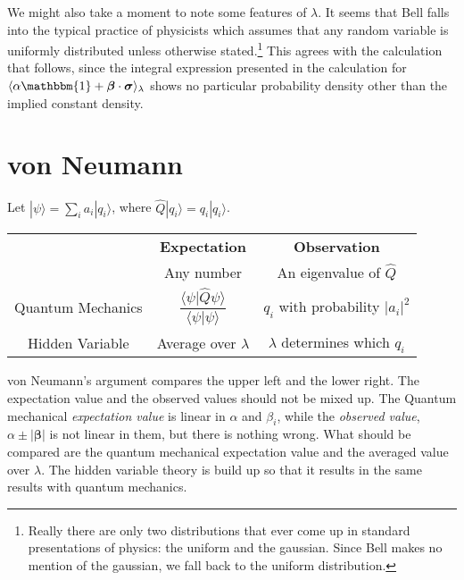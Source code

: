 \documentclass[12pt]{article}
\begin{document}
We might also take a moment to note some features of $\lambda$. It seems that Bell falls into the typical practice of physicists which assumes that any random variable is uniformly distributed unless otherwise stated.\footnote{Really there are only two distributions that ever come up in standard presentations of physics: the uniform and the gaussian. Since Bell makes no mention of the gaussian, we fall back to the uniform distribution.} This agrees with the calculation that follows, since the integral expression presented in the calculation for $\langle \alpha \mathbbm{1} + \bm{\beta} \cdot \bm{\sigma} \rangle_{\lambda}$ shows no particular probability density other than the implied constant density.

\section{von Neumann}
Let $|\psi\rangle=\sum_{i}a_i|q_i\rangle$, where $\hat{Q}|q_i\rangle = q_i |q_i\rangle$.
\begin{center}
  \begin{tabular}{ccc}
    \toprule
    & \textbf{Expectation} & \textbf{Observation} \\
    & Any number & An eigenvalue of $\hat{Q}$ \\
    \midrule
    Quantum Mechanics & $\dfrac{\langle \psi | \hat{Q}\psi \rangle}{\langle \psi | \psi \rangle}$ & $q_i$ with probability $|a_i|^2$\\
    Hidden Variable & Average over $\lambda$ & $\lambda$ determines which $q_i$ \\
    \bottomrule
  \end{tabular}
\end{center}
von Neumann's argument compares the upper left and the lower right. The expectation value and the observed values should not be mixed up. The Quantum mechanical {\it expectation value} is linear in $\alpha$ and $\beta_i$, while the {\it observed value}, $\alpha\pm|\bm{\beta}|$ is not linear in them, but there is nothing wrong. What should be compared are the quantum mechanical expectation value and the averaged value over $\lambda$. The hidden variable theory is build up so that it results in the same results with quantum mechanics.






\end{document}
